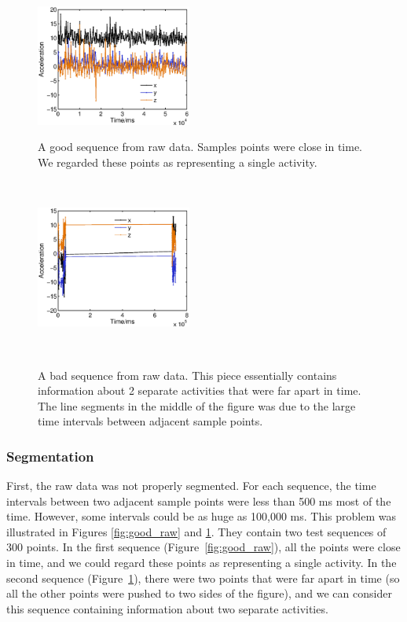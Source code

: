 \documentclass{article} %
\begin{document}
\begin{figure}
    \hspace{-0.5cm}
    \begin{minipage}[t]{0.02\textwidth}~
    \end{minipage}
    \begin{minipage}[t]{0.47\textwidth}
    \centering
    \includegraphics[height=40mm]{fig/good_raw.eps}
    \caption{A good sequence from raw data. Samples points were close in time. We regarded these points as representing a single activity.}
    \label{fig:good_raw}
    \end{minipage}
    \begin{minipage}[t]{0.02\textwidth}~
    \end{minipage}
    \begin{minipage}[t]{0.47\textwidth}
    \centering
    \includegraphics[height=40mm]{fig/bad_raw.eps}\\
    \caption{A bad sequence from raw data. This piece essentially contains information about 2 separate activities that were far apart in time. The line segments in the middle of the figure was due to the large time intervals between adjacent sample points.}
    \label{fig:bad_raw}
    \end{minipage}
    \begin{minipage}[t]{0.02\textwidth}~
    \end{minipage}%
 \end{figure}


\subsubsection{Segmentation} %
First, the raw data was not properly segmented. For each sequence, the time intervals between two adjacent sample points were less than 500 ms most of the time. However, some intervals could be as huge as 100,000 ms. This problem was illustrated in Figures \ref{fig:good_raw} and \ref{fig:bad_raw}. They contain two test sequences of 300 points. In the first sequence (Figure~\ref{fig:good_raw}), all the points were close in time, and we could regard these points as representing a single activity. In the second sequence (Figure~\ref{fig:bad_raw}), there were two points that were far apart in time (so all the other points were pushed to two sides of the figure), and we can consider this sequence containing information about two separate activities. 
\end{document}
